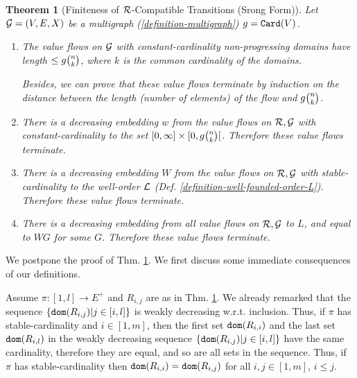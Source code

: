 \documentclass{lmcs}
\newtheorem{theorem}{Theorem}[section]
\begin{document}
 \begin{theorem}[Finiteness of ${\mathcal R}$-Compatible Transitions (Srong Form)]
\label{theorem-finiteness-value-flow-2}
Let ${\mathcal G}=(V,E,X)$ be a multigraph (\ref{definition-multigraph}) 
$g = {\tt Card}(V)$. 
\begin{enumerate}
\item
\label{theorem-finiteness-value-flow-2-1}
The value flows on ${\mathcal G}$ 
with \emph{constant-cardinality non-progressing domains} 
have length $\le g\newton{n}{k}$, where $k$ is 
the common cardinality of the domains.

Besides, we can prove that these value flows terminate 
by induction on the distance
between the length (number of elements)
of the flow and $g\newton{n}{k}$.

\item 
\label{theorem-finiteness-value-flow-2-2}
There is a decreasing embedding $w$ from the value flows on ${\mathcal R}, {\mathcal G}$ 
with \emph{constant-cardinality} to the set 
$[0,\infty] \times [0,g\newton{n}{k}[$. 
Therefore these value flows terminate.

\item
\label{theorem-finiteness-value-flow-2-3}
There is a decreasing embedding $W$ 
from the value flows on ${\mathcal R}, {\mathcal G}$ with 
\emph{stable-cardinality} to the well-order ${\mathcal L}$ 
(Def. \ref{definition-well-founded-order-L}).
Therefore these value flows terminate.

\item
\label{theorem-finiteness-value-flow-2-4}
There is a decreasing embedding from \emph{all} value flows on ${\mathcal R}, {\mathcal G}$ 
to $L$, and equal to $WG$ for some  $G$. 
Therefore these value flows terminate.
\end{enumerate}
\end{theorem}

We postpone the proof of Thm. \ref{theorem-finiteness-value-flow-2}.
We first discuss some immediate consequences of our definitions.

Assume $\pi:[1,l] \rightarrow E^+$ 
and $R_{i,j}$ are as in Thm. \ref{theorem-finiteness-value-flow-2}. We already remarked that 
the sequence $\{{\tt dom}(R_{i,j}) | j \in [i,l]\}$ is weakly decreasing w.r.t. inclusion.
Thus, if $\pi$ has stable-cardinality and $i \in[1,m]$, 
then the first set ${\tt dom}(R_{i,i})$ and the last set ${\tt dom}(R_{i,l})$ in the weakly 
decreasing sequence $\{{\tt dom}(R_{i,j}) | j \in [i,l]\}$ have the same cardinality,
therefore they are equal, and so are all sets in the sequence. 
Thus, if $\pi$ has stable-cardinality then ${\tt dom}(R_{i,i}) = {\tt dom}(R_{i,j})$
for all $i,j \in[1,m]$, $i \le j$.
\end{document}
